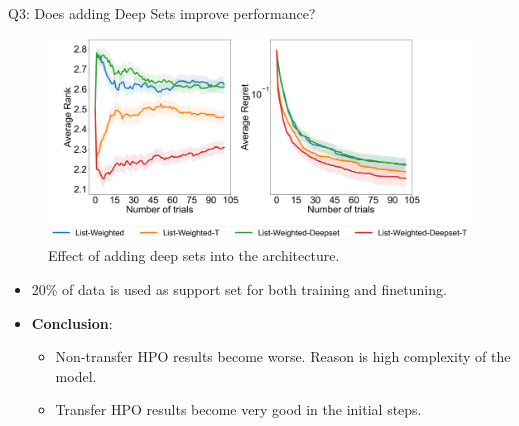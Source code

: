 \documentclass{beamer}
\begin{document}
\begin{frame}[t]{Q3: Does adding Deep Sets improve performance?}

\begin{figure}[h]
  \centering
    \includegraphics[scale=0.12]{images/Q3Ablation}
    \caption{Effect of adding deep sets into the architecture.}
    \label{fig:Q3Ablation}
\end{figure}

\begin{itemize}
\item 20\% of data is used as support set for both training and finetuning.
\item \textbf{Conclusion}:
\begin{itemize}
\item Non-transfer HPO results become worse.  Reason is high complexity of the model.
\item Transfer HPO results become very good in the initial steps.
\end{itemize}
\end{itemize}

\end{frame}
\end{document}
